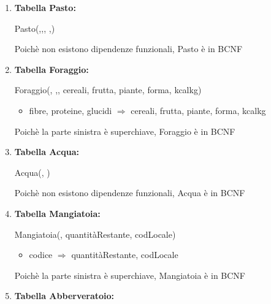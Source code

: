 \documentclass[12pt,a4paper]{article}
\begin{document}
\begin{enumerate}
\item[] \textbf{Tabella Pasto:}

Pasto(\underline{},\underline{},\underline{}, \underline{},\underline{})

Poichè non esistono dipendenze funzionali, Pasto è in BCNF
\vspace{10pt}



\item[] \textbf{Tabella Foraggio:}

Foraggio(\underline{}, \underline{},\underline{}, cereali, frutta, piante, forma, kcalkg)
\begin{itemize}
\vspace{-5pt}
\item fibre, proteine, glucidi $\Rightarrow$ cereali, frutta, piante, forma, kcalkg
\vspace{-5pt}
\end{itemize}
Poichè la parte sinistra è superchiave, Foraggio è in BCNF
\vspace{10pt}



\item[] \textbf{Tabella Acqua:}

Acqua(\underline{}, \underline{})

Poichè non esistono dipendenze funzionali, Acqua è in BCNF
\vspace{10pt}



\item[] \textbf{Tabella Mangiatoia:}

Mangiatoia(\underline{}, quantitàRestante,  codLocale)
\begin{itemize}
\vspace{-5pt}
\item codice $\Rightarrow$ quantitàRestante, codLocale
\vspace{-5pt}
\end{itemize}
Poichè la parte sinistra è superchiave, Mangiatoia è in BCNF
\vspace{10pt}



\item[] \textbf{Tabella Abberveratoio:}


\end{enumerate}
\end{document}
